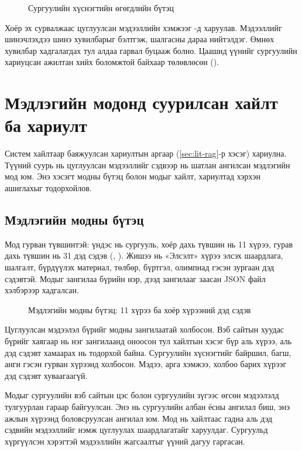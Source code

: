 \begin{figure}[ht]
\centering
{}
\caption{Сургуулийн хүснэгтийн өгөгдлийн бүтэц}
\label{fig:datamodel}
\end{figure}

Хоёр эх сурвалжаас цуглуулсан мэдээллийн хэмжээг -д харуулав. Мэдээллийг шинэчлэхдээ шинэ хувилбарыг бэлтгэж, шалгасны дараа нийтэлдэг. Өмнөх хувилбар хадгалагдах тул алдаа гарвал буцааж болно. Цаашид үүнийг сургуулийн хариуцсан ажилтан хийх боломжтой байхаар төлөвлөсөн ().

\section{Мэдлэгийн модонд суурилсан хайлт ба хариулт}
\label{sec:rag-method}

Систем хайлтаар баяжуулсан хариултын аргаар (\ref{sec:lit-rag}-р хэсэг) хариулна. Түүний суурь нь цуглуулсан мэдээллийг сэдвээр нь шатлан ангилсан мэдлэгийн мод юм. Энэ хэсэгт модны бүтэц болон модыг хайлт, хариултад хэрхэн ашиглахыг тодорхойлов.

\subsection{Мэдлэгийн модны бүтэц}

Мод гурван түвшинтэй: үндэс нь сургууль, хоёр дахь түвшин нь 11 хүрээ, гурав дахь түвшин нь 31 дэд сэдэв (, ). Жишээ нь «Элсэлт» хүрээ элсэх шаардлага, шалгалт, бүрдүүлэх материал, төлбөр, бүртгэл, олимпиад гэсэн зургаан дэд сэдэвтэй. Модыг зангилаа бүрийн нэр, дээд зангилааг заасан JSON файл хэлбэрээр хадгалсан.

\begin{figure}[ht]
\centering
{}
\caption{Мэдлэгийн модны бүтэц: 11 хүрээ ба хоёр хүрээний дэд сэдэв}
\label{fig:tree}
\end{figure}

Цуглуулсан мэдээлэл бүрийг модны зангилаатай холбосон. Вэб сайтын хуудас бүрийг хаягаар нь нэг зангилаанд оноосон тул хайлтын хэсэг бүр аль хүрээ, аль дэд сэдэвт хамаарах нь тодорхой байна. Сургуулийн хүснэгтийг байршил, багш, анги гэсэн гурван хүрээнд холбосон. Мэдээ, арга хэмжээ, холбоо барих хүрээг дэд сэдэвт хуваагаагүй.

Модыг сургуулийн вэб сайтын цэс болон сургуулийн зүгээс өгсөн мэдээлэлд тулгуурлан гараар байгуулсан. Энэ нь сургуулийн албан ёсны ангилал биш, энэ ажлын хүрээнд боловсруулсан ангилал юм. Мод нь хайлтаас гадна аль дэд сэдвийн мэдээллийг нэмж цуглуулах шаардлагатайг харуулдаг. Сургуульд хүргүүлсэн хэрэгтэй мэдээллийн жагсаалтыг үүний дагуу гаргасан.

